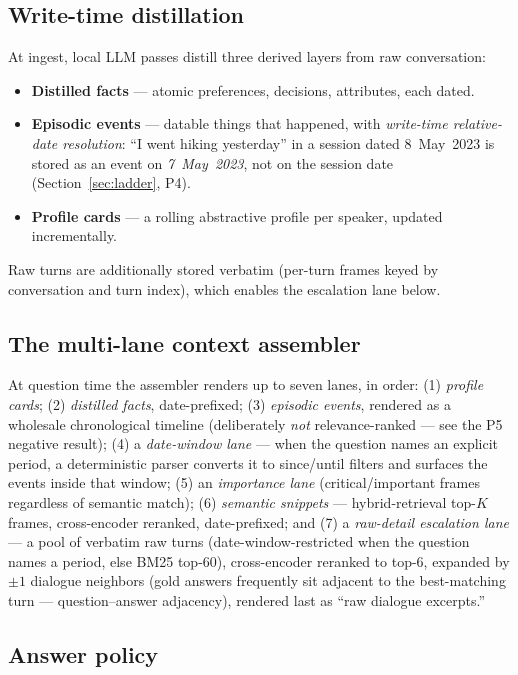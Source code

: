 \documentclass[11pt]{article}
\begin{document}
\subsection{Write-time distillation}

At ingest, local LLM passes distill three derived layers from raw
conversation:
\begin{itemize}[leftmargin=1.4em]
\item \textbf{Distilled facts} --- atomic preferences, decisions,
  attributes, each dated.
\item \textbf{Episodic events} --- datable things that happened, with
  \emph{write-time relative-date resolution}: ``I went hiking
  yesterday'' in a session dated 8~May~2023 is stored as an event on
  \emph{7~May~2023}, not on the session date
  (Section~\ref{sec:ladder}, P4).
\item \textbf{Profile cards} --- a rolling abstractive profile per
  speaker, updated incrementally.
\end{itemize}
Raw turns are additionally stored verbatim (per-turn frames keyed by
conversation and turn index), which enables the escalation lane below.

\subsection{The multi-lane context assembler}

At question time the assembler renders up to seven lanes, in order:
(1) \emph{profile cards}; (2) \emph{distilled facts}, date-prefixed;
(3) \emph{episodic events}, rendered as a wholesale chronological
timeline (deliberately \emph{not} relevance-ranked --- see the P5
negative result); (4) a \emph{date-window lane} --- when the question
names an explicit period, a deterministic parser converts it to
since/until filters and surfaces the events inside that window; (5) an
\emph{importance lane} (critical/important frames regardless of
semantic match); (6) \emph{semantic snippets} --- hybrid-retrieval
top-$K$ frames, cross-encoder reranked, date-prefixed; and (7) a
\emph{raw-detail escalation lane} --- a pool of verbatim raw turns
(date-window-restricted when the question names a period, else BM25
top-60), cross-encoder reranked to top-6, expanded by $\pm1$ dialogue
neighbors (gold answers frequently sit adjacent to the best-matching
turn --- question--answer adjacency), rendered last as
``raw dialogue excerpts.''

\subsection{Answer policy}
\end{document}
